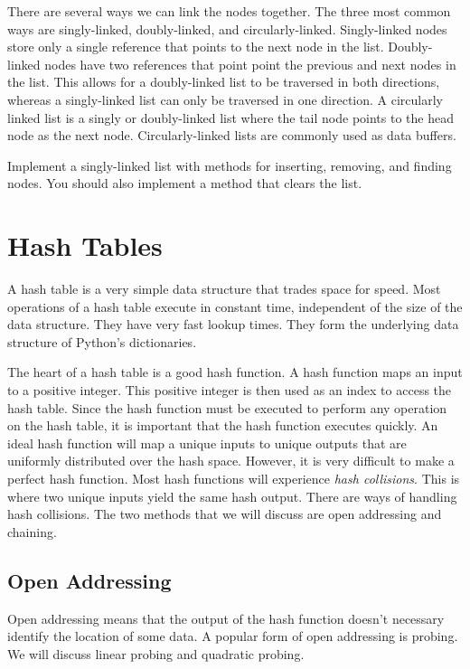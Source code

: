 There are several ways we can link the nodes together.  The three most common ways are singly-linked, doubly-linked, and circularly-linked.  
Singly-linked nodes store only a single reference that points to the next node in the list.  
Doubly-linked nodes have two references that point point the previous and next nodes in the list.  
This allows for a doubly-linked list to be traversed in both directions, whereas a singly-linked list can only be traversed in one direction. 
A circularly linked list is a singly or doubly-linked list where the tail node points to the head node as the next node.  
Circularly-linked lists are commonly used as data buffers.

\begin{problem}
Implement a singly-linked list with methods for inserting, removing, and finding nodes.  You should also implement a method that clears the list.
\end{problem}

\section*{Hash Tables}
A hash table is a very simple data structure that trades space for speed.
Most operations of a hash table execute in constant time, independent of the size of the data structure.  
They have very fast lookup times.  They form the underlying data structure of Python's dictionaries.

The heart of a hash table is a good hash function.  
A hash function maps an input to a positive integer. 
This positive integer is then used as an index to access the hash table. 
Since the hash function must be executed to perform any operation on the hash table, it is important that the hash function executes quickly.
An ideal hash function will map a unique inputs to unique outputs that are uniformly distributed over the hash space. 
However, it is very difficult to make a perfect hash function.  Most hash functions will experience \emph{hash collisions}. 
This is where two unique inputs yield the same hash output.
There are ways of handling hash collisions.  The two methods that we will discuss are open addressing and chaining.

\subsection*{Open Addressing}
Open addressing means that the output of the hash function doesn't necessary identify the location of some data.
A popular form of open addressing is probing. 
We will discuss linear probing and quadratic probing.

